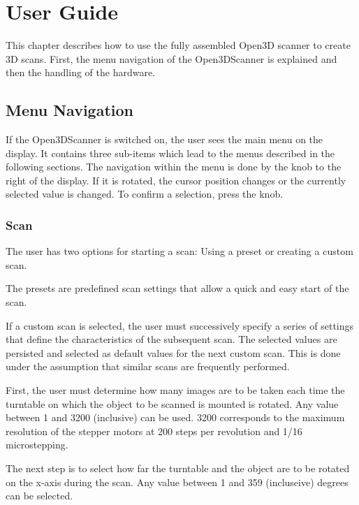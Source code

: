 \chapter{User Guide}
\label{c:userGuide}
This chapter describes how to use the fully assembled Open3D scanner to create 3D scans. First, the menu navigation of the Open3DScanner is explained and then the handling of the hardware.%

\section{Menu Navigation}%
If the Open3DScanner is switched on, the user sees the main menu on the display. It contains three sub-items which lead to the menus described in the following sections. The navigation within the menu is done by the knob to the right of the display. If it is rotated, the cursor position changes or the currently selected value is changed. To confirm a selection, press the knob.%

\subsection{Scan}%
The user has two options for starting a scan: Using a preset or creating a custom scan.%

The presets are predefined scan settings that allow a quick and easy start of the scan.%

If a custom scan is selected, the user must successively specify a series of settings that define the characteristics of the subsequent scan. The selected values are persisted and selected as default values for the next custom scan. This is done under the assumption that similar scans are frequently performed.%

First, the user must determine how many images are to be taken each time the turntable on which the object to be scanned is mounted is rotated. Any value between 1 and 3200 (inclusive) can be used. 3200 corresponds to the maximum resolution of the stepper motors at 200 steps per revolution and 1/16 microstepping.%

The next step is to select how far the turntable and the object are to be rotated on the x-axis during the scan. Any value between 1 and 359 (incluseive) degrees can be selected.%

